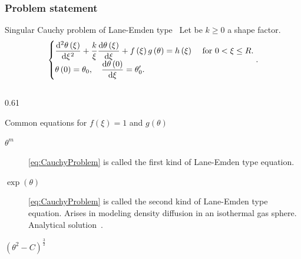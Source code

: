 \begin{frame}
    \frametitle{Problem statement}
    \begin{block}{Singular Cauchy problem of Lane-Emden type~\cite{Okunuga2012}}
        Let be $k\geq 0$ a shape factor.
        \begin{equation}
            \begin{cases}\displaystyle
                \diff[2]{\theta\left(\xi\right)}{\xi}+
                \frac{k}{\xi}
                \diff{\theta\left(\xi\right)}{\xi}+
                f\left(\xi\right)
                g\left(\theta\right)=
                h\left(\xi\right)
                 & \text { for }0<\xi\leq R. \\\displaystyle
                \theta
                \left(0\right)=
                \theta_{0},\quad
                \diff{\theta\left(0\right)}{\xi}=
                \theta^{\prime}_{0}.
                 &
            \end{cases}.\label{eq:CauchyProblem}
        \end{equation}
    \end{block}

    \pause

    \begin{columns}[c]
        \begin{column}{0.61\textwidth}
            \begin{alertblock}{Common equations for $f\left(\xi\right)=1$ and $g\left(\theta\right)$~\cite{umesh}}
                \begin{description}
                    \item[$\theta^{m}$]

                          \eqref{eq:CauchyProblem} is called the first kind of Lane-Emden type equation.

                    \item[$\exp\left(\theta\right)$]

                          \eqref{eq:CauchyProblem} is called the second kind of Lane-Emden type equation.
                          Arises in modeling density diffusion in an isothermal gas sphere.
                          Analytical solution~\cite{alzate2014}.

                    \item[${\left(\theta^{2}-C\right)}^{\frac{3}{2}}$]


\end{description}
\end{alertblock}
\end{column}
\end{columns}
\end{frame}
